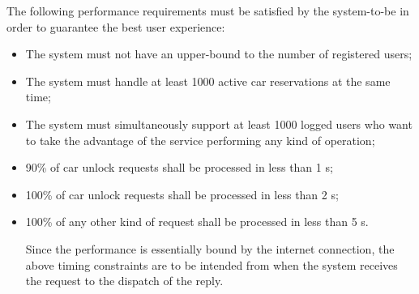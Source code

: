 The following performance requirements must be satisfied by the system-to-be in order to guarantee the best user experience:
\begin{itemize}
\item The system must not have an upper-bound to the number of registered users;
\item The system must handle at least 1000 active car reservations at the same time;
\item The system must simultaneously support at least 1000 logged users who want to take the advantage of the service performing any kind of operation;
\item 90\% of car unlock requests shall be processed in less than 1 s;
\item 100\% of car unlock requests shall be processed in less than 2 s;
\item 100\% of any other kind of request shall be processed in less than 5 s.

Since the performance is essentially bound by the internet connection, the above timing constraints are to be intended from when the system receives the request to the dispatch of the reply.
\end{itemize}